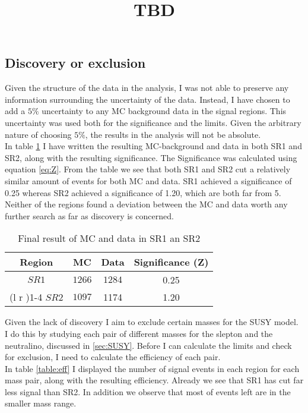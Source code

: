 \documentclass{article}
\begin{document}
\subsection{Discovery or exclusion}
Given the structure of the data in the analysis, I was not able to preserve any information surrounding the uncertainty of the data. Instead, I have chosen to add a $5\%$ uncertainty to any MC background data in the signal regions. This uncertainty was used both for the significance and the limits. Given the arbitrary nature of choosing $5\%$, the results in the analysis will not be absolute.
\\
In table \ref{table:SR1_SR2} I have written the resulting MC-background and data in both SR1 and SR2, along with the resulting significance. The Significance was calculated using equation \ref{eq:Z}. From the table we see that both SR1 and SR2 cut a relatively similar amount of events for both MC and data. SR1 achieved a significance of 0.25 whereas SR2 achieved a significance of 1.20, which are both far from 5. Neither of the regions found a deviation between the MC and data worth any further search as far as discovery is concerned.
\\
\bgroup
\title{TBD}
{\tabcolsep=20pt
\begin{table}
    \caption{Final result of MC and data in SR1 an SR2}
    \label{table:SR1_SR2}
    \centering 
    \begin{threeparttable}
    \begin{tabular}{cccc}
    \textbf{Region} & \textbf{MC} & \textbf{Data} & \textbf{Significance (Z)}\\
    \midrule\midrule
    $SR1$   & $1266$ &  $1284$ & 0.25 \\%
    \cmidrule(l  r ){1-4}
    $SR2$ & $1097$ &  1174 & 1.20 \\ 
    \midrule\midrule
    \end{tabular}
    \end{threeparttable}
\end{table}
}
\egroup
Given the lack of discovery I aim to exclude certain masses for the SUSY model. I do this by studying each pair of different masses for the slepton and the neutralino, discussed in \ref{sec:SUSY}. Before I can calculate the limits and check for exclusion, I need to calculate the efficiency of each pair. 
\\
In table \ref{table:eff} I displayed the number of signal events in each region for each mass pair, along with the resulting efficiency. Already we see that SR1 has cut far less signal than SR2. In addition we observe that most of events left are in the smaller mass range. 
\end{document}
